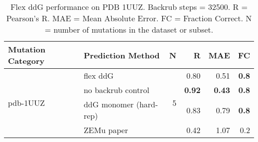 \begin{table}
  \begin{tabular}{llrrrr}
\toprule
Mutation Category &       Prediction Method &  N &    R &  MAE &  FC \\
\midrule
 \multirow{ 4}{*}{pdb-1UUZ} & flex ddG & \multirow{ 4}{*}{5} & 0.80 & 0.51 & \textbf{0.8}  \\
 & no backrub control & & \textbf{0.92} & \textbf{0.43} & \textbf{0.8}  \\
 & ddG monomer (hard-rep) & & 0.83 & 0.79 & \textbf{0.8}  \\
 & ZEMu paper & & 0.42 & 1.07 & 0.2  \\
\bottomrule
\end{tabular}
  \caption[Flex ddG performance on PDB 1UUZ]{
    Flex ddG performance on PDB 1UUZ. Backrub steps = 32500. R = Pearson's R. MAE = Mean Absolute Error. FC = Fraction Correct. N = number of mutations in the dataset or subset.
  } \label{tab:table-pdb-1UUZ}
\end{table}
